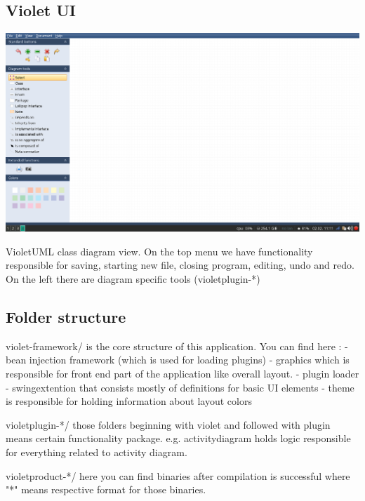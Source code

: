 \documentclass{article}
\begin{document}
\subsection{Violet UI}

\includegraphics{assets/violetUI}

VioletUML class diagram view. On the top menu we have functionality responsible for saving, starting new file, closing program, editing, undo and redo.
On the left there are diagram specific tools (violetplugin-*)

\subsection{Folder structure}

violet-framework/ is the core structure of this application. You can find here :\newline\newline
- bean injection framework (which is used for loading plugins)\newline
- graphics which is responsible for front end part of the application like overall layout.\newline
- plugin loader\newline
- swingextention that consists mostly of definitions for basic UI elements\newline
- theme is responsible for holding information about layout colors\newline

violetplugin-*/ those folders beginning with violet and followed with plugin means certain functionality
package. e.g. activitydiagram holds logic responsible for everything related to activity diagram.

violetproduct-*/ here you can find binaries after compilation is successful
where "*" means respective format for those binaries.
\end{document}
